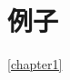 \documentclass{ctexbook}
\begin{document}
\chapter{例子}
\label{chapter1}
\autoref{chapter1}
\end{document}

